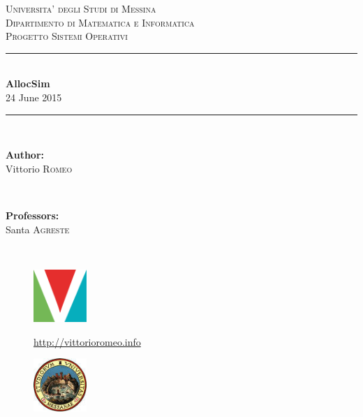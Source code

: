 \documentclass[12pt]{report}
\newcommand{\HRule}{\rule{\linewidth}{0.5mm}}
\renewcommand\emph{\textbf}
\begin{document}
    \begin{titlepage}

        \center

        \textsc{\LARGE Universita' degli Studi di Messina}\\[0.1cm]
        \textsc{\Large Dipartimento di Matematica e Informatica}\\[0.5cm]
        \textsc{\Large Progetto Sistemi Operativi}\\[0.5cm]

        \HRule \\[0.4cm]
        { \huge \bfseries AllocSim}\\[0.1cm]

        {\large 24 June 2015}
        \HRule \\[1.5cm]

        \begin{minipage}{0.4\textwidth}
        \begin{flushleft} \large
        \emph{Author:}\\
        Vittorio \textsc{Romeo}
        \end{flushleft}
        \end{minipage}
        ~
        \begin{minipage}{0.4\textwidth}
        \begin{flushright} \large
        \emph{Professors:} \\
        Santa \textsc{Agreste}

        \end{flushright}
        \end{minipage}\\[4cm]

        \vfill

        \begin{minipage}{\linewidth}
            \centering
            \begin{minipage}{0.35\linewidth}
                \begin{figure}[H]
                    \center
                    \includegraphics[width=2cm, height=2cm]{logovee}

                    \url{http://vittorioromeo.info}
                \end{figure}
            \end{minipage}
            \hspace{0.27\linewidth}
            \begin{minipage}{0.35\linewidth}
                \begin{figure}[H]
                    \center
                    \includegraphics[width=2cm, height=2cm]{logounime}


\end{figure}
\end{minipage}
\end{minipage}
\end{titlepage}
\end{document}
